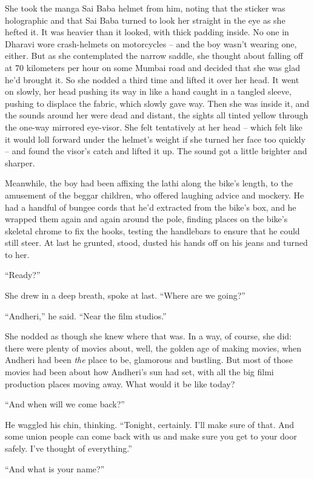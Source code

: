 She took the manga Sai Baba helmet from him, noting that the
sticker was holographic and that Sai Baba turned to look her
straight in the eye as she hefted it. It was heavier than it
looked, with thick padding inside. No one in Dharavi wore
crash-helmets on motorcycles -- and the boy wasn't wearing one,
either. But as she contemplated the narrow saddle, she thought
about falling off at 70 kilometers per hour on some Mumbai road and
decided that she was glad he'd brought it. So she nodded a third
time and lifted it over her head. It went on slowly, her head
pushing its way in like a hand caught in a tangled sleeve, pushing
to displace the fabric, which slowly gave way. Then she was inside
it, and the sounds around her were dead and distant, the sights all
tinted yellow through the one-way mirrored eye-visor. She felt
tentatively at her head -- which felt like it would loll forward
under the helmet's weight if she turned her face too quickly -- and
found the visor's catch and lifted it up. The sound got a little
brighter and sharper.

Meanwhile, the boy had been affixing the lathi along the bike's
length, to the amusement of the beggar children, who offered
laughing advice and mockery. He had a handful of bungee cords that
he'd extracted from the bike's box, and he wrapped them again and
again around the pole, finding places on the bike's skeletal chrome
to fix the hooks, testing the handlebars to ensure that he could
still steer. At last he grunted, stood, dusted his hands off on his
jeans and turned to her.

``Ready?''

She drew in a deep breath, spoke at last. ``Where are we going?''

``Andheri,'' he said. ``Near the film studios.''

She nodded as though she knew where that was. In a way, of course,
she did: there were plenty of movies about, well, the golden age of
making movies, when Andheri had been \emph{the} place to be,
glamorous and bustling. But most of those movies had been about how
Andheri's sun had set, with all the big filmi production places
moving away. What would it be like today?

``And when will we come back?''

He waggled his chin, thinking. ``Tonight, certainly. I'll make sure
of that. And some union people can come back with us and make sure
you get to your door safely. I've thought of everything.''

``And what is your name?''


